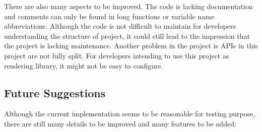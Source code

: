 There are also many aspects to be improved. The code is lacking documentation and comments can only be found in long functions or variable name abbreviations. Although the code is not difficult to maintain for developers understanding the structure of project, it could still lead to the impression that the project is lacking maintenance. Another problem in the project is APIs in this project are not fully split. For developers intending to use this project as rendering library, it might not be easy to configure.

\subsection{Future Suggestions}

Although the current implementation seems to be reasonable for testing purpose, there are still many details to be improved and many features to be added:


